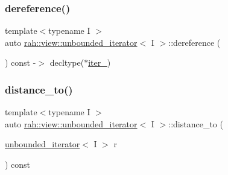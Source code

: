 \subsubsection{\texorpdfstring{dereference()}{dereference()}\hspace{0.1cm}{\footnotesize\ttfamily [2/2]}}
{\footnotesize\ttfamily template$<$typename I $>$ \\
auto \mbox{\hyperlink{structrah_1_1view_1_1unbounded__iterator}{rah\+::view\+::unbounded\+\_\+iterator}}$<$ I $>$\+::dereference (\begin{DoxyParamCaption}{ }\end{DoxyParamCaption}) const -\/$>$ decltype($\ast$\mbox{\hyperlink{structrah_1_1view_1_1unbounded__iterator_a50affaae71d4122b92014b11763f6672}{iter\+\_\+}}) \hspace{0.3cm}{\ttfamily [inline]}}

\mbox{\label{structrah_1_1view_1_1unbounded__iterator_a3f5ca68b137f2fb1175a100a0839a71a}} 
\subsubsection{\texorpdfstring{distance\_to()}{distance\_to()}\hspace{0.1cm}{\footnotesize\ttfamily [1/2]}}
{\footnotesize\ttfamily template$<$typename I $>$ \\
auto \mbox{\hyperlink{structrah_1_1view_1_1unbounded__iterator}{rah\+::view\+::unbounded\+\_\+iterator}}$<$ I $>$\+::distance\+\_\+to (\begin{DoxyParamCaption}\item[{\mbox{\hyperlink{structrah_1_1view_1_1unbounded__iterator}{unbounded\+\_\+iterator}}$<$ I $>$}]{r }\end{DoxyParamCaption}) const\hspace{0.3cm}{\ttfamily [inline]}}

\mbox{\label{structrah_1_1view_1_1unbounded__iterator_a3f5ca68b137f2fb1175a100a0839a71a}} 
